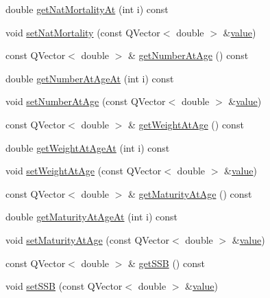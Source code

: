 \begin{DoxyCompactItemize}
\item 
double \mbox{\hyperlink{class_population_data_a98ffd5f7f0a3ec6e2fb9b2505b3b3378}{get\+Nat\+Mortality\+At}} (int i) const
\item 
void \mbox{\hyperlink{class_population_data_a0e73e4eb833f02b3e6e91a049a909e8a}{set\+Nat\+Mortality}} (const Q\+Vector$<$ double $>$ \&\mbox{\hyperlink{diffusion_8cpp_a4b41795815d9f3d03abfc739e666d5da}{value}})
\item 
const Q\+Vector$<$ double $>$ \& \mbox{\hyperlink{class_population_data_abff5464e8988fa6a24a3afe65c8f0998}{get\+Number\+At\+Age}} () const
\item 
double \mbox{\hyperlink{class_population_data_a49c67aa9f7d4b8acd16ec08f69bb9ce2}{get\+Number\+At\+Age\+At}} (int i) const
\item 
void \mbox{\hyperlink{class_population_data_a370b583d10e96619c35816e91b527a69}{set\+Number\+At\+Age}} (const Q\+Vector$<$ double $>$ \&\mbox{\hyperlink{diffusion_8cpp_a4b41795815d9f3d03abfc739e666d5da}{value}})
\item 
const Q\+Vector$<$ double $>$ \& \mbox{\hyperlink{class_population_data_a8aa3d55fd7444814442fe4265b24d759}{get\+Weight\+At\+Age}} () const
\item 
double \mbox{\hyperlink{class_population_data_ae1cd5b6c261a85878a590891c874dc48}{get\+Weight\+At\+Age\+At}} (int i) const
\item 
void \mbox{\hyperlink{class_population_data_ac4ff0185284bbbb41b1c0efb15ade2cc}{set\+Weight\+At\+Age}} (const Q\+Vector$<$ double $>$ \&\mbox{\hyperlink{diffusion_8cpp_a4b41795815d9f3d03abfc739e666d5da}{value}})
\item 
const Q\+Vector$<$ double $>$ \& \mbox{\hyperlink{class_population_data_a27c8e2ff839e2823e4be1f9675bde788}{get\+Maturity\+At\+Age}} () const
\item 
double \mbox{\hyperlink{class_population_data_a24a472a88f96e9bacbebe39d6517f7a8}{get\+Maturity\+At\+Age\+At}} (int i) const
\item 
void \mbox{\hyperlink{class_population_data_aaa8392ac05be1922c145e2307ddd3c26}{set\+Maturity\+At\+Age}} (const Q\+Vector$<$ double $>$ \&\mbox{\hyperlink{diffusion_8cpp_a4b41795815d9f3d03abfc739e666d5da}{value}})
\item 
const Q\+Vector$<$ double $>$ \& \mbox{\hyperlink{class_population_data_acaee2b0654f474c75883d934945f7e36}{get\+S\+SB}} () const
\item 
void \mbox{\hyperlink{class_population_data_a3d9157cd5a98d7f826fe0490334f657b}{set\+S\+SB}} (const Q\+Vector$<$ double $>$ \&\mbox{\hyperlink{diffusion_8cpp_a4b41795815d9f3d03abfc739e666d5da}{value}})
\end{DoxyCompactItemize}


